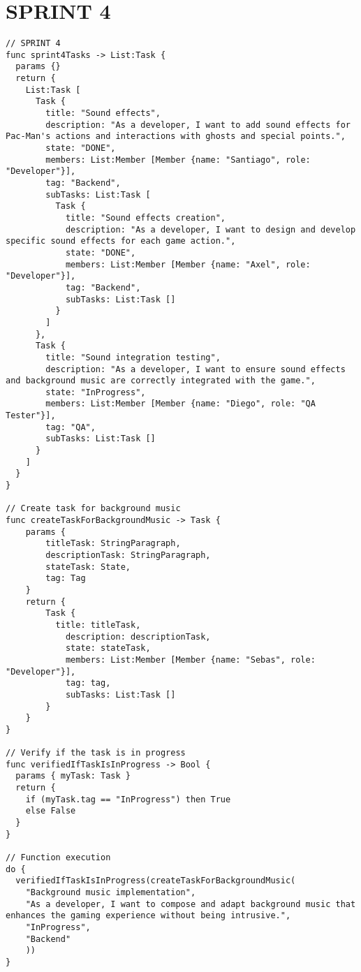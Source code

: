 \documentclass{article}
\begin{document}
\section{SPRINT 4}
\begin{verbatim}
// SPRINT 4
func sprint4Tasks -> List:Task {
  params {}
  return {
    List:Task [
      Task {
        title: "Sound effects",
        description: "As a developer, I want to add sound effects for Pac-Man's actions and interactions with ghosts and special points.",
        state: "DONE",
        members: List:Member [Member {name: "Santiago", role: "Developer"}],
        tag: "Backend",
        subTasks: List:Task [
          Task {
            title: "Sound effects creation",
            description: "As a developer, I want to design and develop specific sound effects for each game action.",
            state: "DONE",
            members: List:Member [Member {name: "Axel", role: "Developer"}],
            tag: "Backend",
            subTasks: List:Task []
          }
        ]
      },
      Task {
        title: "Sound integration testing",
        description: "As a developer, I want to ensure sound effects and background music are correctly integrated with the game.",
        state: "InProgress",
        members: List:Member [Member {name: "Diego", role: "QA Tester"}],
        tag: "QA",
        subTasks: List:Task []
      }
    ]
  }
}

// Create task for background music
func createTaskForBackgroundMusic -> Task {
    params {
        titleTask: StringParagraph,
        descriptionTask: StringParagraph,
        stateTask: State,
        tag: Tag
    }
    return {
        Task {
          title: titleTask,
	        description: descriptionTask,
	        state: stateTask,
	        members: List:Member [Member {name: "Sebas", role: "Developer"}],
	        tag: tag,
	        subTasks: List:Task []
        }
    }
}

// Verify if the task is in progress
func verifiedIfTaskIsInProgress -> Bool {
  params { myTask: Task }
  return {
    if (myTask.tag == "InProgress") then True
    else False
  }
}

// Function execution
do {
  verifiedIfTaskIsInProgress(createTaskForBackgroundMusic(
    "Background music implementation", 
    "As a developer, I want to compose and adapt background music that enhances the gaming experience without being intrusive.", 
    "InProgress", 
    "Backend"
    ))
}
\end{verbatim}
\end{document}
